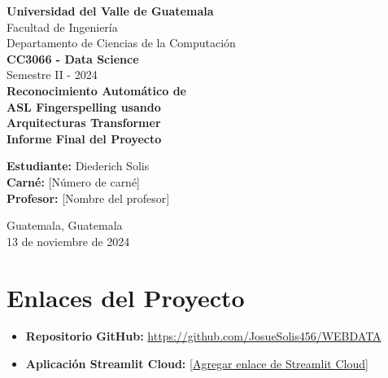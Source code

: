 \documentclass[12pt,a4paper]{article}
\begin{document}
\begin{titlepage}
    \centering
    \vspace*{2cm}
    
    {\huge\textbf{Universidad del Valle de Guatemala}}\\[0.5cm]
    {\Large Facultad de Ingeniería}\\[0.2cm]
    {\Large Departamento de Ciencias de la Computación}\\[1.5cm]
    
    {\Huge\textbf{CC3066 - Data Science}}\\[0.8cm]
    {\Large Semestre II - 2024}\\[2cm]
    
    {\Huge\color{blue!70!black}\textbf{Reconocimiento Automático de}}\\[0.3cm]
    {\Huge\color{blue!70!black}\textbf{ASL Fingerspelling usando}}\\[0.3cm]
    {\Huge\color{blue!70!black}\textbf{Arquitecturas Transformer}}\\[2cm]
    
    {\Large\textbf{Informe Final del Proyecto}}\\[1.5cm]
    
    \begin{minipage}{0.8\textwidth}
        \centering
        {\large\textbf{Estudiante:} Diederich Solis}\\[0.3cm]
        {\large\textbf{Carné:} [Número de carné]}\\[0.3cm]
        {\large\textbf{Profesor:} [Nombre del profesor]}\\[0.8cm]
    \end{minipage}
    
    \vfill
    {\large Guatemala, Guatemala}\\
    {\large 13 de noviembre de 2024}
\end{titlepage}

\newpage
\tableofcontents
\newpage

\section{Enlaces del Proyecto}

\begin{itemize}[leftmargin=2cm]
    \item[\textbf{🔗}] \textbf{Repositorio GitHub:} \url{https://github.com/JosueSolis456/WEBDATA}
    \item[\textbf{🚀}] \textbf{Aplicación Streamlit Cloud:} \url{[Agregar enlace de Streamlit Cloud]}
\end{itemize}
\end{document}
